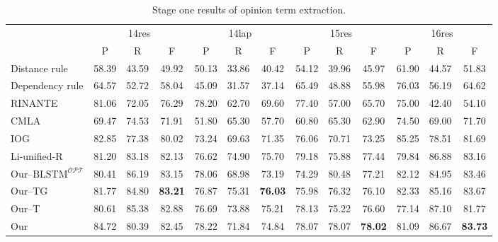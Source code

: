 \documentclass[letterpaper]{article} \usepackage{aaai20}  \usepackage{times}  \usepackage{helvet} \usepackage{courier}  \usepackage[hyphens]{url}  \usepackage{graphicx} \urlstyle{rm} \def\UrlFont{\rm}  \usepackage{graphicx}  \frenchspacing  \setlength{\pdfpagewidth}{8.5in}  \setlength{\pdfpageheight}{11in}
\begin{document}
\begin{table*}[t]
\caption{Stage one results of opinion term extraction.}
\label{tab:stage1_opt}
\begin{small}
\centering
\begin{tabular}{l|ccc|ccc|ccc|ccc}
\hline
 & \multicolumn{3}{c|}{14res}                       & \multicolumn{3}{c|}{14lap}                       & \multicolumn{3}{c|}{15res}              & \multicolumn{3}{c}{16res}                       \\ \cline{2-13} 
                  & P              & R              & F              & P              & R              & F              & P              & R              & F     & P              & R              & F              \\ \hline
Distance rule     & 58.39          & 43.59          & 49.92          & 50.13          & 33.86          & 40.42          & 54.12          & 39.96          & 45.97 & 61.90          & 44.57          & 51.83          \\
Dependency rule   & 64.57          & 52.72          & 58.04          & 45.09          & 31.57          & 37.14          & 65.49          & 48.88          & 55.98 & 76.03          & 56.19          & 64.62          \\
RINANTE           & 81.06          & 72.05          & 76.29          & 78.20          & 62.70          & 69.60          & 77.40          & 57.00          & 65.70 & 75.00          & 42.40          & 54.10          \\
CMLA              & 69.47          & 74.53          & 71.91          & 51.80          & 65.30          & 57.70          & 60.80          & 65.30          & 62.90 & 74.50          & 69.00          & 71.70          \\
IOG               & 82.85 & 77.38          & 80.02          & 73.24          & 69.63          & 71.35          & 76.06          & 70.71          & 73.25 & 85.25 & 78.51          & 81.69          \\
Li-unified-R & 81.20          & 83.18 & 82.13         & 76.62          & 74.90 & 75.70          & 79.18 & 75.88          & 77.44 & 79.84          & 86.88 & 83.16          \\\hline
Our--$\text{BLSTM}^{\mathcal{OPT}}$     & 80.41          & 86.19          & 83.15          & 78.06          & 68.98          & 73.19          & 74.29          & 80.48 & 77.21 & 82.12          & 84.95          & 83.46          \\
Our--TG            & 81.77 & 84.80          & \textbf{83.21} & 76.87          & 75.31 & \textbf{76.03} & 75.98          & 76.32          & 76.10 & 82.33 & 85.16          & 83.67          \\
Our--T     					       & 80.61 & 85.38         & 82.88 & 76.69         & 73.88 & 75.21 & 78.13          & 75.22         & 76.60 & 77.14 & 87.10         & 81.77         \\
Our               & 84.72         & 80.39 & 82.45 & 78.22 & 71.84          & 74.84          & 78.07 & 78.07 & \textbf{78.02} & 81.09          & 86.67 & \textbf{83.73} \\ \hline
\end{tabular}


\end{small}
\end{table*}
\end{document}

